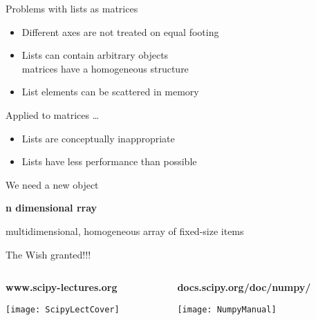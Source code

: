 \begin{frame}{Problems with lists as matrices}
 \begin{itemize}
  \item Different axes are not treated on equal footing
  \item Lists can contain arbitrary objects\\
        matrices have a homogeneous structure
  \item List elements can be scattered in memory
 \end{itemize}

 \vspace{0.3truecm}
 Applied to matrices \dots
 \begin{itemize}
  \item Lists are conceptually inappropriate
  \item Lists have less performance than possible
 \end{itemize}
\end{frame}

\begin{frame}{We need a new object}

 \begin{center}
  \textbf{\Huge\bfseries n dimensional rray}

  \vspace{0.5truecm}
  multidimensional, homogeneous array of fixed-size items
 \end{center}
\end{frame}

\begin{frame}[fragile, t]{The Wish granted!!!}
 \vspace*{-0.5truecm}
 \begin{columns}
  \begin{column}[t]{0.5\linewidth}
   \begin{center}
    \textbf{www.scipy-lectures.org}

    \texttt{[image: ScipyLectCover]}
   \end{center}
  \end{column}%
  \begin{column}[t]{0.5\linewidth}
   \begin{center}
    \textbf{docs.scipy.org/doc/numpy/}

    \vspace{0.3truecm}
    \texttt{[image: NumpyManual]}
   \end{center}
  \end{column}
 \end{columns}
\end{frame}


